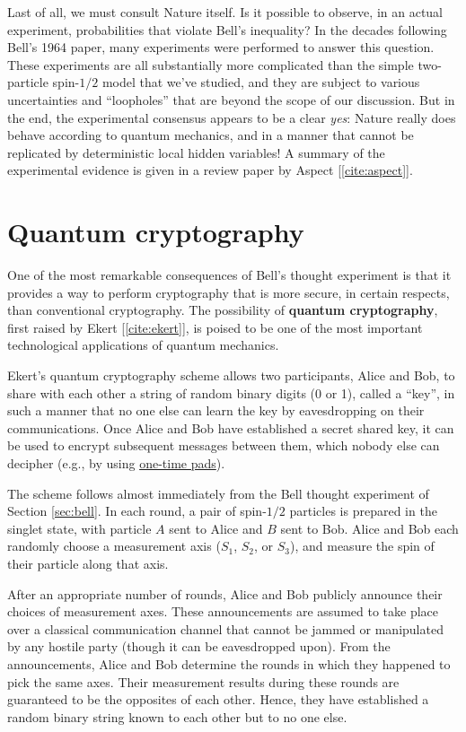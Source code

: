 \documentclass[pra,12pt]{revtex4}
\begin{document}
Last of all, we must consult Nature itself.  Is it possible to
observe, in an actual experiment, probabilities that violate Bell's
inequality?  In the decades following Bell's 1964 paper, many
experiments were performed to answer this question.  These experiments
are all substantially more complicated than the simple two-particle
spin-$1/2$ model that we've studied, and they are subject to various
uncertainties and ``loopholes'' that are beyond the scope of our
discussion.  But in the end, the experimental consensus appears to be
a clear \textit{yes}: Nature really does behave according to quantum
mechanics, and in a manner that cannot be replicated by deterministic
local hidden variables!  A summary of the experimental evidence is
given in a review paper by Aspect [\ref{cite:aspect}].

\section{Quantum cryptography}

One of the most remarkable consequences of Bell's thought experiment
is that it provides a way to perform cryptography that is more secure,
in certain respects, than conventional cryptography.  The possibility
of \textbf{quantum cryptography}, first raised by Ekert
[\ref{cite:ekert}], is poised to be one of the most important
technological applications of quantum mechanics.

Ekert's quantum cryptography scheme allows two participants, Alice and
Bob, to share with each other a string of random binary digits (0 or
1), called a ``key'', in such a manner that no one else can learn the
key by eavesdropping on their communications.  Once Alice and Bob have
established a secret shared key, it can be used to encrypt subsequent
messages between them, which nobody else can decipher (e.g., by using
\href{https://en.wikipedia.org/wiki/One-time_pad}{one-time pads}).

The scheme follows almost immediately from the Bell thought experiment
of Section \ref{sec:bell}.  In each round, a pair of spin-$1/2$
particles is prepared in the singlet state, with particle $A$ sent to
Alice and $B$ sent to Bob.  Alice and Bob each randomly choose a
measurement axis ($S_1$, $S_2$, or $S_3$), and measure the spin of
their particle along that axis.

After an appropriate number of rounds, Alice and Bob publicly announce
their choices of measurement axes.  These announcements are assumed to
take place over a classical communication channel that cannot be
jammed or manipulated by any hostile party (though it can be
eavesdropped upon).  From the announcements, Alice and Bob determine
the rounds in which they happened to pick the same axes.  Their
measurement results during these rounds are guaranteed to be the
opposites of each other.  Hence, they have established a random binary
string known to each other but to no one else.
\end{document}
